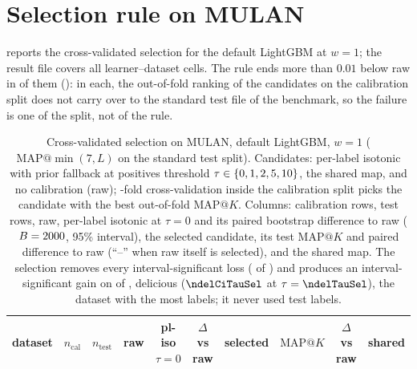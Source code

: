 \documentclass[sigconf,nonacm]{acmart}
\makeatletter
\newcommand{\mapk}{\mathrm{MAP}@K\xspace}
\makeatother
\begin{document}
\section{Selection rule on MULAN}
\label{app:tau}
 reports the cross-validated selection for the default LightGBM at $w{=}1$; the result file covers all \nnTauCells{} learner--dataset cells. The rule ends more than $0.01$ below raw in \nnTauSelBelowRaw{} of them (\ntauFailCells): in each, the out-of-fold ranking of the candidates on the calibration split does not carry over to the standard test file of the benchmark, so the failure is one of the split, not of the rule.
\begin{table}[p]
\caption{Cross-validated selection on MULAN, default LightGBM, $w{=}1$ ($\mathrm{MAP}@\min(7,L)$ on the standard test split). Candidates: per-label isotonic with prior fallback at positives threshold $\tau\in\{0, 1, 2, 5, 10\}$, the shared map, and no calibration (raw); \ntauFolds-fold cross-validation inside the calibration split picks the candidate with the best out-of-fold $\mapk$. Columns: calibration rows, test rows, raw, per-label isotonic at $\tau=0$ and its paired bootstrap difference to raw ($B=2000$, 95\% interval), the selected candidate, its test $\mapk$ and paired difference to raw (``--'' when raw itself is selected), and the shared map. The selection removes every interval-significant loss (\nnHurtAfterTau{} of \nnMulan) and produces an interval-significant gain on \nnTauSigGain{} of \nnMulan, delicious ($\ndelCiTauSel$ at $\tau=\ndelTauSel$), the dataset with the most labels; it never used test labels.}
\label{tab:tau}
\footnotesize
\setlength{\tabcolsep}{4pt}
\begin{tabular}{@{}lrrccccccc@{}}
\toprule
dataset & $n_{\mathrm{cal}}$ & $n_{\mathrm{test}}$ & raw & pl-iso $\tau{=}0$ & $\Delta$ vs raw & selected & $\mapk$ & $\Delta$ vs raw & shared \\
\midrule

\bottomrule
\end{tabular}
\end{table}
\end{document}
